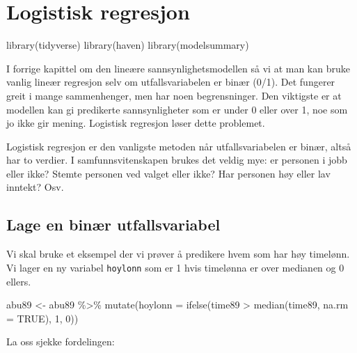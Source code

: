 \documentclass[
  norsk,
  letterpaper,
  DIV=11,
  numbers=noendperiod]{scrreprt}
\newenvironment{Shaded}{\begin{snugshade}}{\end{snugshade}}
\newcommand{\AttributeTok}[1]{\textcolor[rgb]{0.40,0.45,0.13}{#1}}
\newcommand{\ConstantTok}[1]{\textcolor[rgb]{0.56,0.35,0.01}{#1}}
\newcommand{\DecValTok}[1]{\textcolor[rgb]{0.68,0.00,0.00}{#1}}
\newcommand{\FunctionTok}[1]{\textcolor[rgb]{0.28,0.35,0.67}{#1}}
\newcommand{\NormalTok}[1]{\textcolor[rgb]{0.00,0.23,0.31}{#1}}
\newcommand{\OtherTok}[1]{\textcolor[rgb]{0.00,0.23,0.31}{#1}}
\newcommand{\SpecialCharTok}[1]{\textcolor[rgb]{0.37,0.37,0.37}{#1}}
\theoremstyle{definition}
\theoremstyle{remark}
\begin{document}
\chapter{Logistisk regresjon}\label{logistisk-regresjon}

\begin{Shaded}
\begin{Highlighting}[]
\FunctionTok{library}\NormalTok{(tidyverse)}
\FunctionTok{library}\NormalTok{(haven)}
\FunctionTok{library}\NormalTok{(modelsummary)}
\end{Highlighting}
\end{Shaded}

I forrige kapittel om den lineære sannsynlighetsmodellen så vi at man
kan bruke vanlig lineær regresjon selv om utfallsvariabelen er binær
(0/1). Det fungerer greit i mange sammenhenger, men har noen
begrensninger. Den viktigste er at modellen kan gi predikerte
sannsynligheter som er under 0 eller over 1, noe som jo ikke gir mening.
Logistisk regresjon løser dette problemet.

Logistisk regresjon er den vanligste metoden når utfallsvariabelen er
binær, altså har to verdier. I samfunnsvitenskapen brukes det veldig
mye: er personen i jobb eller ikke? Stemte personen ved valget eller
ikke? Har personen høy eller lav inntekt? Osv.

\section{Lage en binær
utfallsvariabel}\label{lage-en-binuxe6r-utfallsvariabel}

Vi skal bruke et eksempel der vi prøver å predikere hvem som har høy
timelønn. Vi lager en ny variabel \texttt{hoylonn} som er 1 hvis
timelønna er over medianen og 0 ellers.

\begin{Shaded}
\begin{Highlighting}[]
\NormalTok{abu89 }\OtherTok{\textless{}{-}}\NormalTok{ abu89 }\SpecialCharTok{\%\textgreater{}\%}
  \FunctionTok{mutate}\NormalTok{(}\AttributeTok{hoylonn =} \FunctionTok{ifelse}\NormalTok{(time89 }\SpecialCharTok{\textgreater{}} \FunctionTok{median}\NormalTok{(time89, }\AttributeTok{na.rm =} \ConstantTok{TRUE}\NormalTok{), }\DecValTok{1}\NormalTok{, }\DecValTok{0}\NormalTok{))}
\end{Highlighting}
\end{Shaded}

La oss sjekke fordelingen:

\begin{Shaded}
\end{Shaded}
\end{document}
